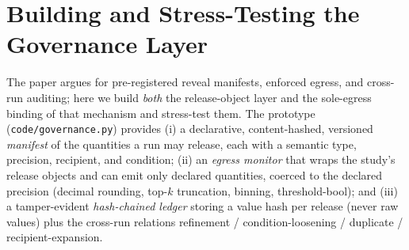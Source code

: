 \documentclass[11pt]{article}
\begin{document}
\section{Building and Stress-Testing the Governance Layer}
\label{sec:governance}
The paper argues for pre-registered reveal manifests, enforced egress, and
cross-run auditing; here we build \emph{both} the release-object layer and the
sole-egress binding of that mechanism and stress-test them. The prototype
(\texttt{code/governance.py})
provides (i) a declarative, content-hashed, versioned \emph{manifest} of the
quantities a run may release, each with a semantic type, precision, recipient,
and condition; (ii) an \emph{egress monitor} that wraps the study's release
objects and can emit only declared quantities, coerced to the declared precision
(decimal rounding, top-$k$ truncation, binning, threshold-bool); and (iii) a
tamper-evident \emph{hash-chained ledger} storing a value hash per release
(never raw values) plus the cross-run relations refinement / condition-loosening
/ duplicate / recipient-expansion.
\end{document}
